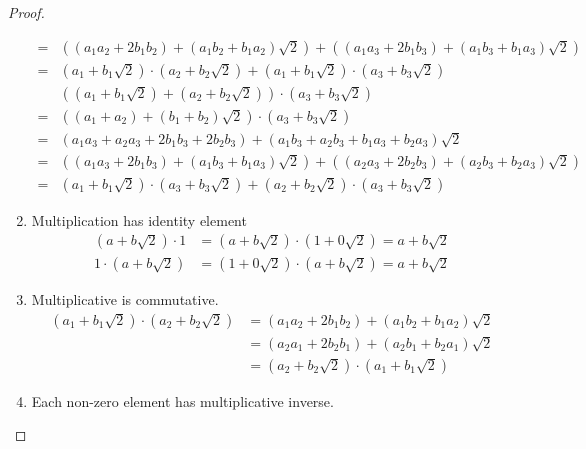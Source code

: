 \begin{proof}
\begin{enumerate}[label = (\arabic*)]
\begin{align*}
                  = & \left((a_{1}a_{2} + 2b_{1}b_{2}) + (a_{1}b_{2} + b_{1}a_{2})\sqrt{2}\right) + \left((a_{1}a_{3} + 2b_{1}b_{3}) + (a_{1}b_{3} + b_{1}a_{3})\sqrt{2}\right) \\
                  = & (a_{1} + b_{1}\sqrt{2})\cdot (a_{2} + b_{2}\sqrt{2}) + (a_{1} + b_{1}\sqrt{2})\cdot (a_{3} + b_{3}\sqrt{2})
              \end{align*}
              \begin{align*}
                    & \left((a_{1} + b_{1}\sqrt{2}) + (a_{2} + b_{2}\sqrt{2})\right)\cdot (a_{3} + b_{3}\sqrt{2})                                                               \\
                  = & \left((a_{1} + a_{2}) + (b_{1} + b_{2})\sqrt{2}\right)\cdot (a_{3} + b_{3}\sqrt{2})                                                                       \\
                  = & \left(a_{1}a_{3} + a_{2}a_{3} + 2b_{1}b_{3} + 2b_{2}b_{3}\right) + (a_{1}b_{3} + a_{2}b_{3} + b_{1}a_{3} + b_{2}a_{3})\sqrt{2}                            \\
                  = & \left((a_{1}a_{3} + 2b_{1}b_{3}) + (a_{1}b_{3} + b_{1}a_{3})\sqrt{2}\right) + \left((a_{2}a_{3} + 2b_{2}b_{3}) + (a_{2}b_{3} + b_{2}a_{3})\sqrt{2}\right) \\
                  = & (a_{1} + b_{1}\sqrt{2})\cdot (a_{3} + b_{3}\sqrt{2}) + (a_{2} + b_{2}\sqrt{2})\cdot (a_{3} + b_{3}\sqrt{2})
              \end{align*}
        \item Multiplication has identity element
              \begin{align*}
                  (a + b\sqrt{2})\cdot 1 & = (a + b\sqrt{2})\cdot (1 + 0\sqrt{2}) = a + b\sqrt{2} \\
                  1\cdot (a + b\sqrt{2}) & = (1 + 0\sqrt{2})\cdot (a + b\sqrt{2}) = a + b\sqrt{2}
              \end{align*}
        \item Multiplicative is commutative.
              \begin{align*}
                  (a_{1} + b_{1}\sqrt{2})\cdot (a_{2} + b_{2}\sqrt{2}) & = (a_{1}a_{2} + 2b_{1}b_{2}) + (a_{1}b_{2} + b_{1}a_{2})\sqrt{2} \\
                                                                       & = (a_{2}a_{1} + 2b_{2}b_{1}) + (a_{2}b_{1} + b_{2}a_{1})\sqrt{2} \\
                                                                       & = (a_{2} + b_{2}\sqrt{2})\cdot (a_{1} + b_{1}\sqrt{2})
              \end{align*}
        \item Each non-zero element has multiplicative inverse.


\end{enumerate}
\end{proof}
